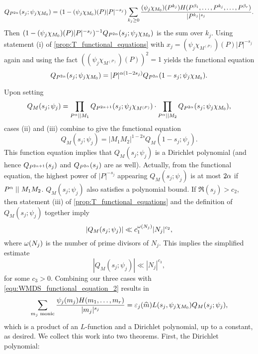 \begin{enumerate}[label=(\roman*)]
        \[
            Q_{P^{2\alpha}}(s_{j};\psi_{j}\chi_{M_{0}}) = (1-(\psi_{j}\chi_{M_{0}})(P)|P|^{-s_{j}})\sum_{k_{j} \ge 0}\frac{(\psi_{j}\chi_{M_{0}})(P^{k_{j}})H(P^{\beta_{1}},\ldots,P^{k_{j}},\ldots,P^{\beta_{r}})}{|P^{k_{j}}|^{s_{j}}}.
        \]
        Then $(1-(\psi_{j}\chi_{M_{0}})(P)|P|^{-s_{j}})^{-1}Q_{P^{2\alpha}}(s_{j};\psi_{j}\chi_{M_{0}})$ is the sum over $k_{j}$. Using statement (i) of \cref{prop:T_functional_equations} with $x_{j} = (\psi_{j}\chi_{M^{(P)}})(P)|P|^{-s_{j}}$ again and using the fact $((\psi_{j}\chi_{M^{(P)}})(P))^{2} = 1$ yields the functional equation
        \[
            Q_{P^{2\alpha}}(s_{j};\psi_{j}\chi_{M_{0}}) = |P|^{\alpha(1-2s_{j})}Q_{P^{2\alpha}}(1-s_{j};\psi_{j}\chi_{M_{0}}).
        \]
    \end{enumerate}
    Upon setting
    \[
        Q_{M}(s_{j};\psi_{j}) = \prod_{P^{\alpha} \mid\mid M_{1}}Q_{P^{2\alpha+1}}(s_{j};\psi_{j}\chi_{M^{(P)}}) \cdot \prod_{P^{\alpha} \mid\mid M_{2}}Q_{P^{2\alpha}}(s_{j};\psi_{j}\chi_{M_{0}}),
    \]
    cases (ii) and (iii) combine to give the functional equation
    \[
        Q_{M}(s_{j};\psi_{j}) = |M_{1}M_{2}|^{1-2s}Q_{M}(1-s_{j};\psi_{j}).
    \]
    This function equation implies that $Q_{M}(s_{j};\psi_{j})$ is a Dirichlet polynomial (and hence $Q_{P^{2\alpha+1}}(s_{j})$ and $Q_{P^{2\alpha}}(s_{j})$ are as well). Actually, from the functional equation, the highest power of $|P|^{-s_{j}}$ appearing $Q_{M}(s_{j};\psi_{j})$ is at most $2\alpha$ if $P^{\alpha} \mid\mid M_{1}M_{2}$. $Q_{M}(s_{j};\psi_{j})$ also satisfies a polynomial bound. If $\Re(s_{j}) > c_{2}$, then statement (iii) of \cref{prop:T_functional_equations} and the definition of $Q_{M}(s_{j};\psi_{j})$ together imply
    \[
        |Q_{M}(s_{j};\psi_{j})| \ll c_{1}^{\omega(N_{j})}|N_{j}|^{c_{2}},
    \]
    where $\omega(N_{j})$ is the number of prime divisors of $N_{j}$. This implies the simplified estimate
    \[
        |Q_{M}(s_{j};\psi_{j})| \ll |N_{j}|^{c_{3}},
    \]
    for some $c_{3} > 0$. Combining our three cases with \cref{equ:WMDS_functional_equation_2} results in
    \begin{equation}\label{equ:WMDS_functional_equation_3}
        \sum_{\text{$m_{j}$ monic}}\frac{\psi_{j}(m_{j})H(m_{1},\ldots,m_{r})}{|m_{j}|^{s_{j}}} = \varepsilon_{j}(\widehat{m})L(s_{j},\psi_{j}\chi_{M_{0}})Q_{M}(s_{j};\psi_{j}),
    \end{equation}
    which is a product of an $L$-function and a Dirichlet polynomial, up to a constant, as desired. We collect this work into two theorems. First, the Dirichlet polynomial:

